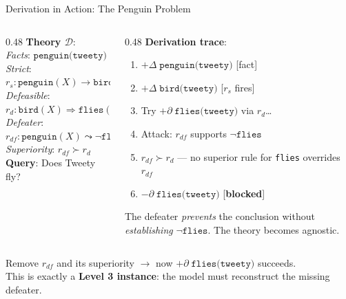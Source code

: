 \documentclass[aspectratio=169]{beamer}
\newcommand{\D}{\mathcal{D}}
\newcommand{\defto}{\Rightarrow}
\newcommand{\strictto}{\rightarrow}
\newcommand{\defeatto}{\leadsto}
\begin{document}
\begin{frame}{Derivation in Action: The Penguin Problem}

\small
\begin{columns}[T]
\begin{column}{0.48\textwidth}
\textbf{Theory $\D$}:\\[3pt]
\footnotesize
\textit{Facts}: $\texttt{penguin(tweety)}$\\[2pt]
\textit{Strict}: $r_s\!: \texttt{penguin}(X) \strictto \texttt{bird}(X)$\\[2pt]
\textit{Defeasible}: $r_d\!: \texttt{bird}(X) \defto \texttt{flies}(X)$\\[2pt]
\textit{Defeater}: $r_{df}\!: \texttt{penguin}(X) \defeatto \neg\texttt{flies}(X)$\\[2pt]
\textit{Superiority}: $r_{df} \succ r_d$\\[6pt]

\small
\textbf{Query}: Does Tweety fly?
\end{column}
\begin{column}{0.48\textwidth}
\textbf{Derivation trace}:\\[3pt]
\footnotesize
\begin{enumerate}\setlength\itemsep{1pt}
    \item $+\Delta\; \texttt{penguin(tweety)}$ \hfill [fact]
    \item $+\Delta\; \texttt{bird(tweety)}$ \hfill [$r_s$ fires]
    \item Try $+\partial\; \texttt{flies(tweety)}$ via $r_d$\ldots
    \item Attack: $r_{df}$ supports $\neg\texttt{flies}$
    \item $r_{df} \succ r_d$ --- no superior rule for \texttt{flies} overrides $r_{df}$
    \item $-\partial\; \texttt{flies(tweety)}$ \hfill [\textbf{blocked}]
\end{enumerate}

\vspace{0.3em}
\small
The defeater \textit{prevents} the conclusion without \textit{establishing} $\neg\texttt{flies}$. The theory becomes agnostic.
\end{column}
\end{columns}

\vspace{0.5em}
\begin{center}
\small
Remove $r_{df}$ and its superiority $\to$ now $+\partial\; \texttt{flies(tweety)}$ succeeds.\\[2pt]
This is exactly a \textbf{Level 3 instance}: the model must reconstruct the missing defeater.
\end{center}
\end{frame}
\end{document}
